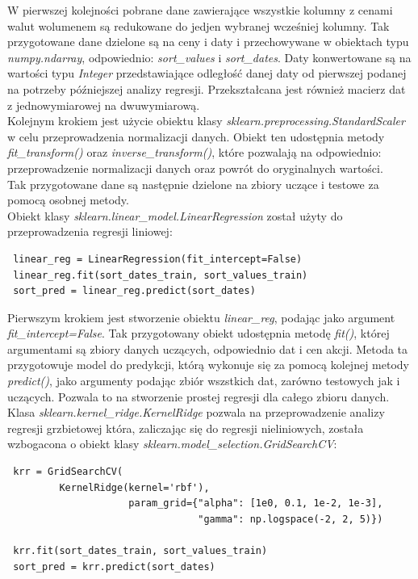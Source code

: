 W pierwszej kolejności pobrane dane zawierające wszystkie kolumny z cenami walut wolumenem są redukowane do jedjen wybranej wcześniej kolumny.
Tak przygotowane dane dzielone są na ceny i daty i przechowywane w obiektach typu \textit{numpy.ndarray}, odpowiednio: \textit{sort\_values} i \textit{sort\_dates}.
Daty konwertowane są na wartości typu \textit{Integer} przedstawiające odległość danej daty od pierwszej podanej na potrzeby późniejszej analizy regresji. Przekształcana jest również macierz dat z jednowymiarowej na dwuwymiarową.\\

Kolejnym krokiem jest użycie obiektu klasy \textit{sklearn.preprocessing.StandardScaler} w celu przeprowadzenia normalizacji danych.
Obiekt ten udostępnia metody \textit{fit\_transform()} oraz \textit{inverse\_transform()}, które pozwalają na odpowiednio: przeprowadzenie normalizacji danych oraz powrót do oryginalnych wartości.\\

Tak przygotowane dane są następnie dzielone na zbiory uczące i testowe za pomocą osobnej metody.\\

Obiekt klasy \textit{sklearn.linear\_model.LinearRegression} został użyty do przeprowadzenia regresji liniowej:
\begin{lstlisting}
 linear_reg = LinearRegression(fit_intercept=False)
 linear_reg.fit(sort_dates_train, sort_values_train)
 sort_pred = linear_reg.predict(sort_dates)
\end{lstlisting}
Pierwszym krokiem jest stworzenie obiektu \textit{linear\_reg}, podając jako argument \textit{fit\_intercept=False}.
Tak przygotowany obiekt udostępnia metodę \textit{fit()}, której argumentami są zbiory danych uczących, odpowiednio dat i cen akcji.
Metoda ta przygotowuje model do predykcji, którą wykonuje się za pomocą kolejnej metody \textit{predict()}, jako argumenty podając zbiór wszstkich dat, zarówno testowych jak i uczących.
Pozwala to na stworzenie prostej regresji dla całego zbioru danych.\\

Klasa \textit{sklearn.kernel\_ridge.KernelRidge} pozwala na przeprowadzenie analizy regresji grzbietowej która, zaliczając się do regresji nieliniowych, została wzbogacona o obiekt klasy \textit{sklearn.model\_selection.GridSearchCV}:
\begin{lstlisting}
 krr = GridSearchCV(
         KernelRidge(kernel='rbf'),
                     param_grid={"alpha": [1e0, 0.1, 1e-2, 1e-3],
                                 "gamma": np.logspace(-2, 2, 5)})

 krr.fit(sort_dates_train, sort_values_train)
 sort_pred = krr.predict(sort_dates)
\end{lstlisting}

